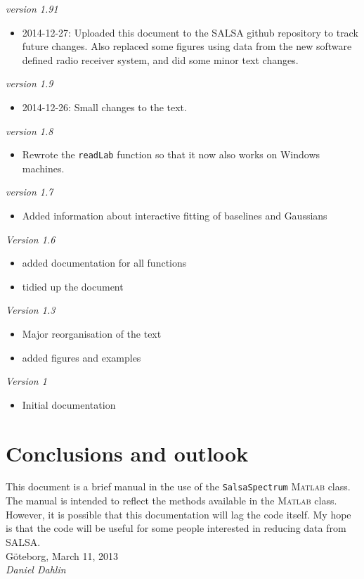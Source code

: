 \documentclass[11pt,a4paper]{article}
\begin{document}
\vspace{2ex}
\noindent 
\emph{version 1.91}
\begin{itemize}
\item 2014-12-27: Uploaded this document to the SALSA github repository to
track future changes. Also replaced some figures using data from the new
software defined radio receiver system, and did some minor text changes.
\end{itemize}
\vspace{2ex}
\noindent 
\emph{version 1.9}
\begin{itemize}
\item 2014-12-26: Small changes to the text.
\end{itemize}
\vspace{2ex}
\noindent 
\emph{version 1.8}
\begin{itemize}
\item Rewrote the \texttt{readLab} function so that it now also works
  on Windows machines. 
\end{itemize}
\vspace{2ex}
\noindent
\emph{version 1.7}
\begin{itemize}
\item Added information about interactive fitting of baselines and
  Gaussians
\end{itemize}
\vspace{2ex}
\noindent
\emph{Version 1.6}
\begin{itemize}
\item added documentation for all functions
\item tidied up the document
\end{itemize}
\vspace{2ex}
\emph{Version 1.3}
\begin{itemize}
\item Major reorganisation of the text
\item added figures and examples
\end{itemize}
\vspace{2ex}
\noindent\emph{Version 1}
\begin{itemize}
\item Initial documentation
\end{itemize}
\vspace{2ex}





\section{Conclusions and outlook}
\label{sec:conclusion-outlook}

This document is a brief manual in the use of the
\texttt{SalsaSpectrum} \textsc{Matlab} class. The manual is intended to reflect
the methods available in the \textsc{Matlab} class. However, it is possible
that this documentation will lag the code itself. My hope is that the
code will be useful for some people interested in reducing data from
SALSA.\\

\hfill G{\"o}teborg, March 11, 2013\\

\hfill \emph{Daniel Dahlin}
\end{document}
